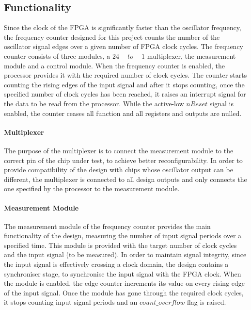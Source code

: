 \subsection{Functionality}

Since the clock of the FPGA is significantly faster than the oscillator frequency, the frequency counter designed for this project counts the number of the oscillator signal edges over a given number of FPGA clock cycles. The frequency counter consists of three modules, a $24-to-1$ multiplexer, the measurement module and a control module. When the frequency counter is enabled, the processor provides it with the required number of clock cycles. The counter starts counting the rising edges of the input signal and after it stops counting, once the specified number of clock cycles has been reached, it raises an interrupt signal for the data to be read from the processor. While the active-low $nReset$ signal is enabled, the counter ceases all function and all registers and outputs are nulled.

\paragraph{Multiplexer}
The purpose of the multiplexer is to connect the measurement module to the correct pin of the chip under test, to achieve better reconfigurability. In order to provide compatibility of the design with chips whose oscillator output can be different, the multiplexer is connected to all design outputs and only connects the one specified by the processor to the measurement module.

\paragraph{Measurement Module}
The measurement module of the frequency counter provides the main functionality of the design, measuring the number of input signal periods over a specified time. This module is provided with the target number of clock cycles and the input signal (to be measured). In order to maintain signal integrity, since the input signal is effectively crossing a clock domain, the design contains a synchroniser stage, to synchronise the input signal with the FPGA clock. When the module is enabled, the edge counter increments its value on every rising edge of the input signal. Once the module has gone through the required clock cycles, it stops counting input signal periods and an $count\_overflow$ flag is raised.


